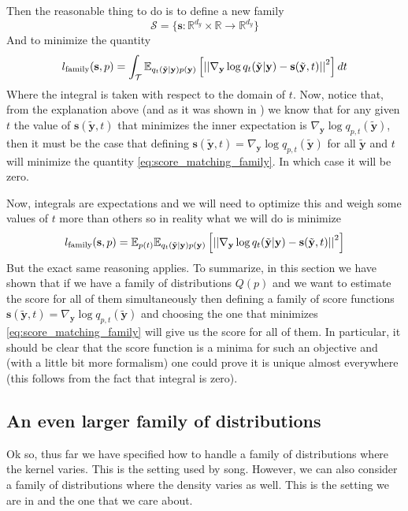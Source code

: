 Then the reasonable thing to do is to define a new family
\[ \mathcal{S} = \{ \mathbf{s}: \mathbb{R}^{d_y} \times \mathbb{R} \to \mathbb{R}^{d_y} \} \]
And to minimize the quantity
\begin{align}
    \label{eq:score_matching_family}
 l_{\text{family}}(\mathbf{s}, p) = \int_{\mathcal{T}} \mathbb{E}_{q_t(\tilde{\mathbf{y}}|\mathbf{y})p(\mathbf{y})} \left[ \left|\left| \nabla_{\mathbf{y}} \log q_t(\tilde{\mathbf{y}}|\mathbf{y}) - \mathbf{s}(\tilde{\mathbf{y}}, t) \right|\right|^2 \right] dt
\end{align}
Where the integral is taken with respect to the domain of $t$.
Now, notice that, from the explanation above (and as it was shown in \cite{song2020generative,vincent2010connection})
we know that for any given $t$ the value of $\mathbf{s}(\tilde{\mathbf{y}}, t)$
that minimizes the inner expectation is  $ \nabla_{\mathbf{y}} \log q_{p,t}(\tilde{\mathbf{y}})$,
then it must be the case that defining $\mathbf{s}(\tilde{\mathbf{y}}, t) = \nabla_{\mathbf{y}} \log q_{p,t}(\tilde{\mathbf{y}})$
for all $\tilde{\mathbf{y}}$ and $t$ will minimize the quantity \cref{eq:score_matching_family}.
In which case it will be zero.

Now, integrals are expectations and we will need to optimize this and weigh some
values of $t$ more than others so in reality what we will do is minimize
\begin{align}
    \label{eq:score_matching_family}
 l_{\text{family}}(\mathbf{s}, p) = \mathbb{E}_{p(t)}\mathbb{E}_{q_t(\tilde{\mathbf{y}}|\mathbf{y})p(\mathbf{y})} \left[ \left|\left| \nabla_{\mathbf{y}} \log q_t(\tilde{\mathbf{y}}|\mathbf{y}) - \mathbf{s}(\tilde{\mathbf{y}}, t) \right|\right|^2 \right]
\end{align}
But the exact same reasoning applies.
To summarize, in this section we have shown that if we have a family of distributions $Q(p)$
and we want to estimate the score for all of them simultaneously then defining
a family of score functions $\mathbf{s}(\tilde{\mathbf{y}}, t) = \nabla_{\mathbf{y}} \log q_{p,t}(\tilde{\mathbf{y}})$
and choosing the one that minimizes \cref{eq:score_matching_family} will give us the score for all of them.
In particular, it should be clear that the score function is a
minima for such an objective and (with a little bit more formalism)
one could prove it is unique almost everywhere (this follows from the fact that integral
is zero).

\subsection*{An even larger family of distributions}
Ok so, thus far we have specified how to handle a family of distributions
where the kernel varies. This is the setting used by song.
However, we can also consider a family of distributions where the density
varies as well. This is the setting we are in and the one that
we care about.

